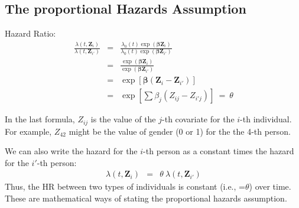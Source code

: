 \documentclass[envcountsect, 10pt, portrait, palatino]{beamer}
\begin{document}
\subsection{The proportional Hazards Assumption}
\begin{frame}{ Hazard Ratio:}
\begin{eqnarray*}
\frac{\lambda(t,{\mathbf{Z}_i})}{\lambda(t,{\mathbf{Z}_{i'}})} & = &
\frac{\lambda_0(t) \exp(\mathbf{\beta} \mathbf{Z}_i)}
{\lambda_0(t) \exp(\mathbf{\beta} \mathbf{Z}_{i'})}\\[2ex]
& = & \frac{\exp(\mathbf{\beta} \mathbf{Z}_i)}
{\exp(\mathbf{\beta} \mathbf{Z}_{i'})}\\[2ex]
& = & \exp[\mathbf{\beta} (\mathbf{Z}_i - \mathbf{Z}_{i'})]\\[2ex]
& = & \exp[\sum \beta_j (Z_{ij} - Z_{i'j})] ~=~ \theta
\end{eqnarray*}
\end{frame}
\begin{frame}
In the last formula, $Z_{ij}$ is the value of the $j$-th covariate
for the $i$-th individual.  For example, $Z_{42}$ might be the value
of {\sc gender} (0 or 1) for the the 4-th person.

\vspace{0.3in}
We can also write the hazard for the $i$-th person as a constant
times the hazard for the $i'$-th person:
\begin{eqnarray*}
\lambda(t,{\mathbf{Z}_i}) & = & \theta ~ \lambda(t,{\mathbf{Z}_{i'}})
\end{eqnarray*}
Thus, the HR between two types of individuals is constant (i.e., =$\theta$)
over time.  These are mathematical ways of stating the proportional
hazards assumption.
\end{frame}
\end{document}
